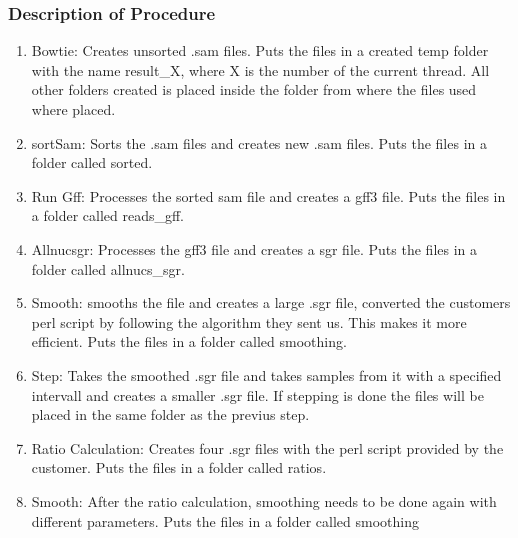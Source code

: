 \subsubsection{Description of Procedure}

\begin{enumerate}
\item Bowtie: Creates unsorted .sam files. Puts the files in a created temp folder with the name result\_X, where X is the number of the current thread. All other folders created is placed inside the folder from where the files used where placed.
\item sortSam: Sorts the .sam files and creates new .sam files. Puts the files in a folder called sorted.
\item Run Gff: Processes the sorted sam file and creates a gff3 file. Puts the files in a folder called reads\_gff.
\item Allnucsgr: Processes the gff3 file and creates a sgr file. Puts the files in a folder called allnucs\_sgr.
\item Smooth: smooths the file and creates a large .sgr file, converted the customers perl script by following the algorithm they  sent us. This makes it more efficient. Puts the files in a folder called smoothing.
\item Step: Takes the smoothed .sgr file and takes samples from it with a specified intervall and creates a smaller .sgr file. If stepping is done the files will be placed in the same folder as the previus step.
\item Ratio Calculation: Creates four .sgr files with the perl script provided by the customer. Puts the files in a folder called ratios.
\item Smooth: After the ratio calculation, smoothing needs to be done again with different parameters. Puts the files in a folder called smoothing
\end{enumerate}



